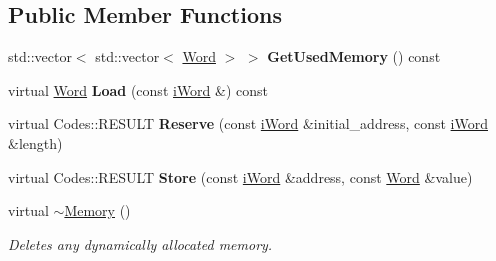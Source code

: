 \subsection*{Public Member Functions}
\begin{DoxyCompactItemize}
\item 
\hypertarget{classMemory_a98671c2e4238df99efd56cb26185a17c}{
std::vector$<$ std::vector$<$ \hyperlink{classWord}{Word} $>$ $>$ {\bfseries GetUsedMemory} () const }
\label{classMemory_a98671c2e4238df99efd56cb26185a17c}

\item 
\hypertarget{classMemory_aca021609915080b38ca1b00d9b416e80}{
virtual \hyperlink{classWord}{Word} {\bfseries Load} (const \hyperlink{classiWord}{iWord} \&) const }
\label{classMemory_aca021609915080b38ca1b00d9b416e80}

\item 
\hypertarget{classMemory_a80cd994d4833dde66b8005184e510dda}{
virtual Codes::RESULT {\bfseries Reserve} (const \hyperlink{classiWord}{iWord} \&initial\_\-address, const \hyperlink{classiWord}{iWord} \&length)}
\label{classMemory_a80cd994d4833dde66b8005184e510dda}

\item 
\hypertarget{classMemory_a23703464fb24710d09be1b2010e79edc}{
virtual Codes::RESULT {\bfseries Store} (const \hyperlink{classiWord}{iWord} \&address, const \hyperlink{classWord}{Word} \&value)}
\label{classMemory_a23703464fb24710d09be1b2010e79edc}

\item 
\hypertarget{classMemory_a0ffa9759ebbf103f11132a505b93bdc0}{
virtual \hyperlink{classMemory_a0ffa9759ebbf103f11132a505b93bdc0}{$\sim$Memory} ()}
\label{classMemory_a0ffa9759ebbf103f11132a505b93bdc0}

\begin{DoxyCompactList}\small\item\em Deletes any dynamically allocated memory. \item\end{DoxyCompactList}\end{DoxyCompactItemize}
